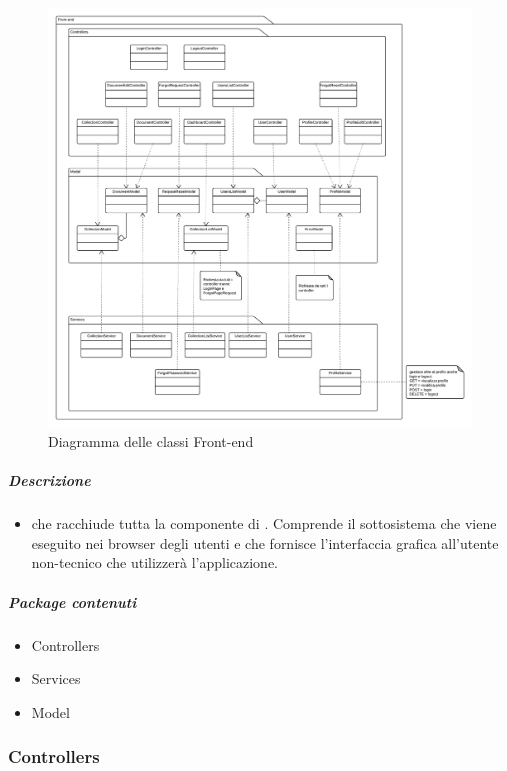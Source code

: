    \begin{figure}[H] 
      \begin{center} 
        \includegraphics[width=\textwidth]{uml/classi/Front-end.png}  
        \caption{Diagramma delle classi Front-end}
      \end{center}  
    \end{figure} 
    
  \subparagraph{Descrizione} 
    \begin{itemize}
    \item[]  che racchiude tutta la componente di . Comprende il sottosistema che viene eseguito nei browser degli utenti e che fornisce l'interfaccia grafica all'utente non-tecnico che utilizzerà l'applicazione.
    \end{itemize} 
    \subparagraph{Package contenuti} 
    \begin{itemize}
        \item Controllers
        \item Services
        \item Model
    \end{itemize}
  \subsubsection{Controllers}
